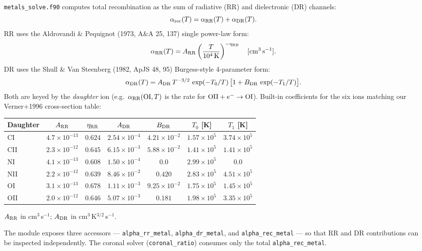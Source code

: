 \documentclass[english,a4paper]{my_memo}
\begin{document}
\texttt{metals\_solve.f90} computes total recombination as the sum of
radiative (RR) and dielectronic (DR) channels:
\[
\alpha_{\rm rec}(T) = \alpha_{\rm RR}(T) + \alpha_{\rm DR}(T).
\]
RR uses the Aldrovandi \& Pequignot (1973, A\&A 25, 137) single
power-law form:
\[
\alpha_{\rm RR}(T) = A_{\rm RR} \left(\frac{T}{10^4\,\mathrm{K}}\right)^{-\eta_{\rm RR}}
\quad [\mathrm{cm^3\,s^{-1}}].
\]
DR uses the Shull \& Van Steenberg (1982, ApJS 48, 95) Burgess-style
4-parameter form:
\[
\alpha_{\rm DR}(T) = A_{\rm DR}\,T^{-3/2}\,\exp(-T_0/T)\,
   \big[1 + B_{\rm DR}\,\exp(-T_1/T)\big].
\]
Both are keyed by the \emph{daughter} ion (e.g.\
$\alpha_{\rm RR}({\rm OI}, T)$ is the rate for
${\rm OII} + e^- \to {\rm OI}$). Built-in coefficients for the six
ions matching our Verner+1996 cross-section table:

\begin{center}
\small
\begin{tabular}{|l|c|c|c|c|c|c|}
\hline
Daughter & $A_{\rm RR}$ & $\eta_{\rm RR}$ & $A_{\rm DR}$ & $B_{\rm DR}$ & $T_0$ [K] & $T_1$ [K] \\
\hline
CI   & $4.7\times 10^{-13}$ & $0.624$ & $2.54\times 10^{-4}$ & $4.21\times 10^{-2}$ & $1.57\times 10^5$ & $3.74\times 10^5$ \\
CII  & $2.3\times 10^{-12}$ & $0.645$ & $6.15\times 10^{-3}$ & $5.88\times 10^{-2}$ & $1.41\times 10^5$ & $1.41\times 10^5$ \\
NI   & $4.1\times 10^{-13}$ & $0.608$ & $1.50\times 10^{-4}$ & $0.0$                & $2.99\times 10^5$ & $0.0$             \\
NII  & $2.2\times 10^{-12}$ & $0.639$ & $8.46\times 10^{-2}$ & $0.420$              & $2.83\times 10^5$ & $4.51\times 10^5$ \\
OI   & $3.1\times 10^{-13}$ & $0.678$ & $1.11\times 10^{-3}$ & $9.25\times 10^{-2}$ & $1.75\times 10^5$ & $1.45\times 10^5$ \\
OII  & $2.0\times 10^{-12}$ & $0.646$ & $5.07\times 10^{-3}$ & $0.181$              & $1.98\times 10^5$ & $3.35\times 10^5$ \\
\hline
\end{tabular}

\smallskip
$A_{\rm RR}$ in cm$^3$\,s$^{-1}$; $A_{\rm DR}$ in cm$^3$\,K$^{3/2}$\,s$^{-1}$.
\end{center}

The module exposes three accessors --- \texttt{alpha\_rr\_metal},
\texttt{alpha\_dr\_metal}, and \texttt{alpha\_rec\_metal} --- so that
RR and DR contributions can be inspected independently. The coronal
solver (\texttt{coronal\_ratio}) consumes only the total
\texttt{alpha\_rec\_metal}.
\end{document}
